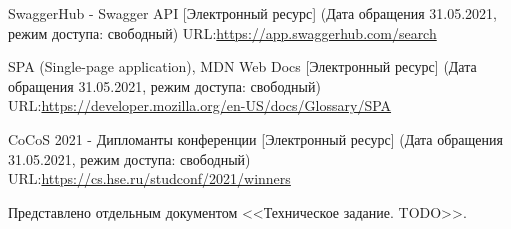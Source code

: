 \documentclass[a4paper,12pt,reqno]{article}
\begin{document}
\begin{thebibliography}{27}
		 SwaggerHub - Swagger API [Электронный ресурс] (Дата обращения 31.05.2021, режим доступа: свободный) URL:\url{https://app.swaggerhub.com/search}
		
		 SPA (Single-page application), MDN Web Docs [Электронный ресурс] (Дата обращения 31.05.2021, режим доступа: свободный) URL:\url{https://developer.mozilla.org/en-US/docs/Glossary/SPA}
		
		 CoCoS 2021 - Дипломанты конференции [Электронный ресурс] (Дата обращения 31.05.2021, режим доступа: свободный) URL:\url{https://cs.hse.ru/studconf/2021/winners}
	\end{thebibliography}

\newpage

Представлено отдельным документом <<Техническое задание. TODO>>. 
\end{document}
